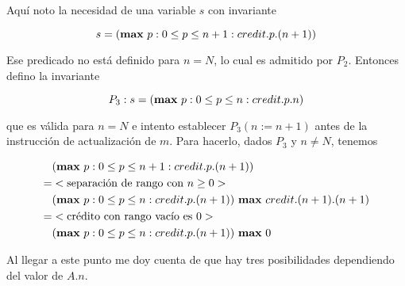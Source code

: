 \documentclass{article}
\begin{document}
Aquí noto la necesidad de una variable $s$ con invariante

$$
s = (\text{{\bf max} } p : 0 \leq p \leq n + 1 : credit.p.(n+1))
$$

Ese predicado no está definido para $n = N$, lo cual es admitido
por $P_2$. Entonces defino la invariante

$$
P_3: s = (\text{{\bf max} } p : 0 \leq p \leq n : credit.p.n)
$$

que es válida para $n = N$ e intento establecer $P_3(n := n+1)$ antes de la
instrucción de actualización de $m$. Para hacerlo, dados $P_3$ y $n \neq N$,
tenemos

\begin{align*}
 & (\text{{\bf max} } p : 0 \leq p \leq n + 1 : credit.p.(n+1)) \\
 = & <\text{separación de rango con } n \geq 0> \\
 & (\text{{\bf max} } p : 0 \leq p \leq n : credit.p.(n+1)) \text{ {\bf max} } credit.(n+1).(n+1) \\
 = & <\text{crédito con rango vacío es } 0> \\
 & (\text{{\bf max} } p : 0 \leq p \leq n : credit.p.(n+1)) \text{ {\bf max} } 0 \\
\end{align*}

Al llegar a este punto me doy cuenta de que hay tres posibilidades 
dependiendo del valor de $A.n$.
\end{document}

